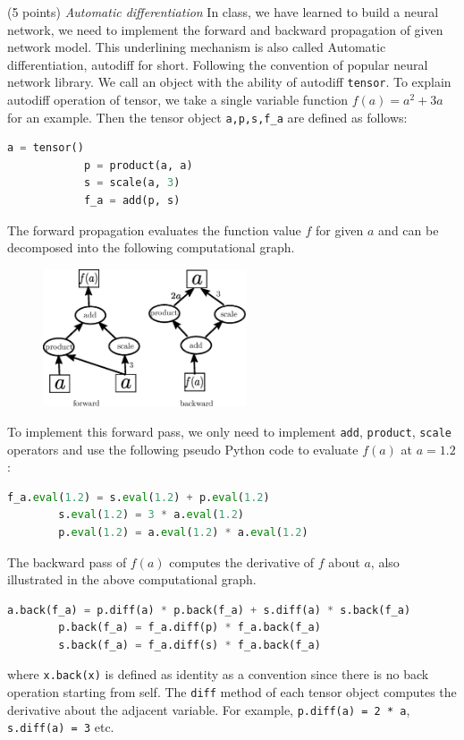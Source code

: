 \documentclass[a4paper, 12pt]{exam}
\begin{document}
	\begin{questions}
		\question (5 points) \emph{Automatic differentiation} In class, we have learned to build a neural network, we need to implement the forward
		and backward propagation of given network model. This underlining mechanism is also called Automatic differentiation, autodiff for short.
		Following the convention of popular neural network library. We call an object with the ability of autodiff \texttt{tensor}.
		To explain autodiff operation of tensor, we take a single variable function $f(a) = a^2 + 3a$ for an example. Then the tensor object
		\texttt{a,p,s,f\_a} are defined as follows:
		\begin{lstlisting}[language=Python]
			a = tensor()
			p = product(a, a)
			s = scale(a, 3)
			f_a = add(p, s)
		\end{lstlisting}
		The forward propagation evaluates the function value $f$ for given $a$ and can be decomposed into the following computational graph.
		\begin{figure}[!ht]
			\centering
			\includegraphics[width=6cm]{auto.eps}
		\end{figure}
		To implement this forward pass, we only need to implement \texttt{add}, \texttt{product}, \texttt{scale} operators and use the following pseudo Python code
		to evaluate $f(a)$ at $a=1.2$:
		\begin{lstlisting}[language=Python]
		f_a.eval(1.2) = s.eval(1.2) + p.eval(1.2)
		s.eval(1.2) = 3 * a.eval(1.2)
		p.eval(1.2) = a.eval(1.2) * a.eval(1.2)
		\end{lstlisting}
		The backward pass of $f(a)$ computes the derivative of $f$ about $a$, also illustrated in the above computational graph.
		\begin{lstlisting}[language=Python]
		a.back(f_a) = p.diff(a) * p.back(f_a) + s.diff(a) * s.back(f_a)
		p.back(f_a) = f_a.diff(p) * f_a.back(f_a)
		s.back(f_a) = f_a.diff(s) * f_a.back(f_a)
		\end{lstlisting}
		where \texttt{x.back(x)} is defined as identity as a convention since there is no back operation starting from self.
		The \texttt{diff} method of each tensor object computes the derivative about the adjacent variable.
		For example, \texttt{p.diff(a) = 2 * a}, \texttt{s.diff(a) = 3} etc.
		

\end{questions}
\end{document}
